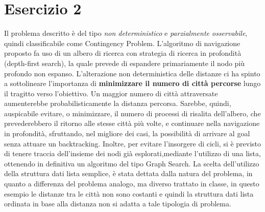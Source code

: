 	\section{Esercizio 2}
		\label{sec:es2}
		Il problema descritto è del tipo \emph{non deterministico} e \emph{parzialmente osservabile}, quindi classificabile come \textsf{Contingency Problem}. L'algoritmo di navigazione proposto fa uso di un albero di ricerca con strategia di ricerca in profondità (\textsf{depth-first search}), la quale prevede di espandere primariamente il nodo più profondo non espanso.
		\newline
		 L'alterazione non deterministica delle distanze ci ha spinto a sottolineare l'importanza di \textbf{minimizzare il numero di città percorse} lungo il tragitto verso l'obiettivo. Un maggior numero di città attraversate aumenterebbe probabilisticamente la distanza percorsa. Sarebbe, quindi, auspicabile evitare, o minimizzare, il numero di processi di risalita dell'albero, che prevederebbero il ritorno alle stesse città più volte, e continuare nella navigazione in profondità, sfruttando, nel migliore dei casi, la possibilità di arrivare al \textsf{goal} senza attuare un \textsf{backtracking}. Inoltre, per evitare l'insorgere di cicli, si è previsto di tenere traccia dell'insieme dei nodi già esplorati,mediante l'utilizzo di una lista, ottenendo in definitiva un algoritmo del tipo \textsf{Graph Search}.
La scelta dell'utilizzo della struttura dati lista semplice, è stata dettata dalla natura del problema, in quanto a differenza del problema analogo, ma diverso trattato in classe, in questo esempio le distanze tra le città non sono costanti e quindi la struttura dati lista ordinata in base alla distanza non si adatta a tale tipologia di problema.
